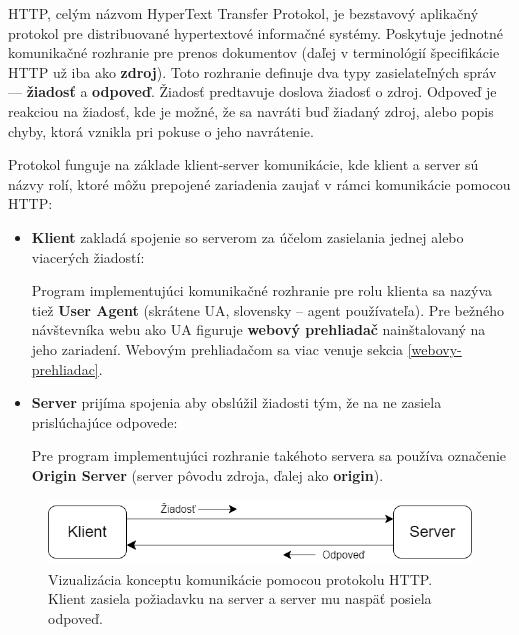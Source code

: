 HTTP, celým názvom HyperText Transfer Protokol, je bezstavový aplikačný protokol pre distribuované hypertextové informačné systémy. 
Poskytuje jednotné komunikačné rozhranie pre prenos dokumentov (daľej v terminológií špecifikácie HTTP už iba ako \textbf{zdroj}).
Toto rozhranie definuje dva typy zasielateľných správ --- \textbf{žiadosť} a \textbf{odpoveď}. 
Žiadosť predtavuje doslova žiadosť o zdroj. 
Odpoveď je reakciou na žiadosť, kde je možné, že sa navráti buď žiadaný zdroj, alebo popis chyby, ktorá vznikla pri pokuse o jeho navrátenie. 

Protokol funguje na základe klient-server komunikácie, kde klient a server sú názvy rolí, ktoré môžu prepojené zariadenia zaujať v rámci komunikácie pomocou HTTP:
\begin{itemize}
    \item \textbf{Klient} zakladá spojenie so serverom za účelom zasielania jednej alebo viacerých \mbox{žiadostí}: 
    
    Program implementujúci komunikačné rozhranie pre rolu klienta sa nazýva tiež \textbf{User Agent} (skrátene UA, slovensky -- agent používateľa). 
    Pre bežného návštevníka webu ako UA \mbox{figuruje} \textbf{webový prehliadač} nainštalovaný na jeho zariadení. 
    Webovým prehliadačom sa viac venuje sekcia \ref{webovy-prehliadac}.
    
    \item \textbf{Server} prijíma spojenia aby obslúžil žiadosti tým, že na ne zasiela prislúchajúce odpovede:

    Pre program implementujúci rozhranie takéhoto servera sa používa označenie \textbf{Origin Server} (server pôvodu zdroja, ďalej ako \textbf{origin}).
\end{itemize}

\begin{figure}[htb]
\begin{center}
    \includegraphics[scale=0.6]{obrazky-figures/http-client-server.png}
    \caption{\centering Vizualizácia konceptu komunikácie pomocou protokolu HTTP. Klient zasiela požiadavku na server a server mu naspäť posiela odpoveď.}
    \label{fig:http-client-server}
\end{center}
\end{figure}

